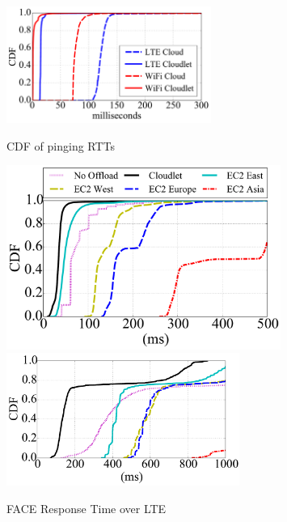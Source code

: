 \begin{figure}
    \begin{minipage}[c]{3in}
        \begin{center}
            \includegraphics[height=1.5in]{FIGS/ping_cdf.pdf}
            \caption{CDF of pinging RTTs}
            \label{fig:ping-CDF}
        \end{center}
    \end{minipage}
    \begin{minipage}[c]{3.5in}
        \begin{center}
            \hspace{0.2in}
            \includegraphics[width=0.8\textwidth,clip,trim=91pt 376pt 0 0]{FIGS/Legend-Wifi.pdf}
            \includegraphics[width=3in]{FIGS/Face-LTE.pdf}
            \caption{FACE Response Time over LTE}
            \label{fig:response-time-lte-face}
        \end{center}
    \end{minipage}
\end{figure}


